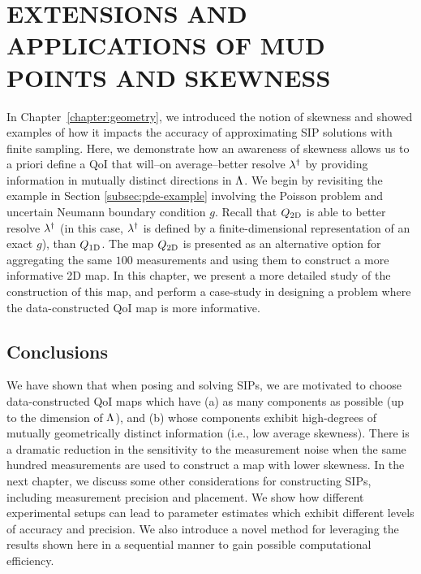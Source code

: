 \chapter{\uppercase{Extensions and Applications of MUD Points and Skewness} \label{chapter:vector-valued}}
In Chapter~\ref{chapter:geometry}, we introduced the notion of skewness and showed examples of how it impacts the accuracy of approximating SIP solutions with finite sampling.
Here, we demonstrate how an awareness of skewness allows us to a priori define a QoI that will\---on average\---better resolve $\lambda^\dagger$ by providing information in mutually distinct directions in ${\Lambda}$.
We begin by revisiting the example in Section \ref{subsec:pde-example} involving the Poisson problem and uncertain Neumann boundary condition $g$.
Recall that $Q_\text{2D}$ is able to better resolve $\lambda^\dagger$ (in this case, $\lambda^\dagger$ is defined by a finite-dimensional representation of an exact $g$), than $Q_\text{1D}$.
The map $Q_\text{2D}$ is presented as an alternative option for aggregating the same $100$ measurements and using them to construct a more informative 2D map.
In this chapter, we present a more detailed study of the construction of this map, and perform a case-study in designing a problem where the data-constructed QoI map is more informative.


\FloatBarrier


\FloatBarrier





\FloatBarrier


\section{Conclusions}

We have shown that when posing and solving SIPs, we are motivated to choose data-constructed QoI maps which have (a) as many components as possible (up to the dimension of ${\Lambda}$), and (b) whose components exhibit high-degrees of mutually geometrically distinct information (i.e., low average skewness).
There is a dramatic reduction in the sensitivity to the measurement noise when the same hundred measurements are used to construct a map with lower skewness.
In the next chapter, we discuss some other considerations for constructing SIPs, including measurement precision and placement.
We show how different experimental setups can lead to parameter estimates which exhibit different levels of accuracy and precision.
We also introduce a novel method for leveraging the results shown here in a sequential manner to gain possible computational efficiency.
